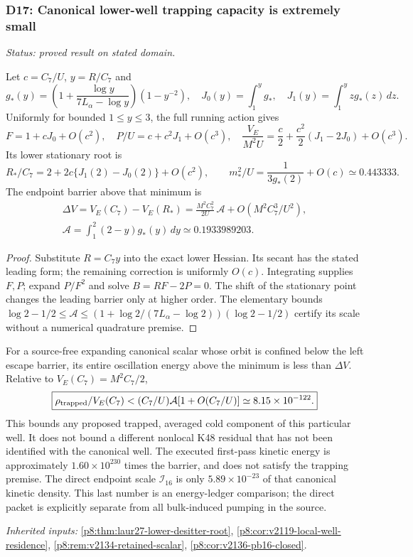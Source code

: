 \documentclass[12pt,a4paper]{article}
\begin{document}
\subsubsection{D17: Canonical lower-well trapping capacity is extremely small}
\label{p8:sec:v2201-derived-d17}
\noindent\textit{Status: proved result on stated domain.}

Let $c=C_7/U$, $y=R/C_7$ and
\[
 g_*(y)=\left(1+\frac{\log y}{7L_\alpha-\log y}\right)(1-y^{-2}),
 \quad J_0(y)=\int_1^y g_*,\quad J_1(y)=\int_1^y zg_*(z)\,dz.
\]
Uniformly for bounded $1\le y\le3$, the full running action gives
\[
 F=1+cJ_0+O(c^2),\quad P/U=c+c^2J_1+O(c^3),\quad
 \frac{V_E}{M^2U}=\frac c2+\frac{c^2}{2}(J_1-2J_0)+O(c^3).
\]
Its lower stationary root is
\[
 R_*/C_7=2+2c\{J_1(2)-J_0(2)\}+O(c^2),\qquad
 m_*^2/U=\frac1{3g_*(2)}+O(c)\simeq0.443333.
\]
The endpoint barrier above that minimum is
\begin{gather*}
 \boxed{\Delta V=V_E(C_7)-V_E(R_*)
 =\frac{M^2C_7^2}{2U}\,\mathcal A+O(M^2C_7^3/U^2),}\\
 \mathcal A=\int_1^2(2-y)g_*(y)\,dy\simeq0.1933989203.
\end{gather*}
\begin{proof}
Substitute $R=C_7y$ into the exact lower Hessian. Its secant
has the stated leading form; the remaining correction is uniformly $O(c)$.
Integrating supplies $F,P$; expand $P/F^2$ and solve $B=RF-2P=0$.
The shift of the stationary point changes the leading barrier only at
higher order. The elementary bounds
$\log2-1/2\le\mathcal A\le(1+\log2/(7L_\alpha-\log2))(\log2-1/2)$
certify its scale without a numerical quadrature premise.
\end{proof}

For a source-free expanding canonical scalar whose orbit is confined below
the left escape barrier, its entire oscillation energy above the minimum is
less than $\Delta V$. Relative to $V_E(C_7)=M^2C_7/2$,
\[
 \boxed{\rho_{\rm trapped}/V_E(C_7)<
 (C_7/U)\mathcal A[1+O(C_7/U)]\simeq8.15\times10^{-122}.}
\]
This bounds any proposed trapped, averaged cold component of this particular
well. It does not bound a different nonlocal K48 residual that has not been
identified with the canonical well. The executed first-pass kinetic energy
is approximately $1.60\times10^{230}$ times the barrier, and does not satisfy
the trapping premise. The direct endpoint scale $\mathcal I_{16}$ is only
$5.89\times10^{-23}$ of that canonical kinetic density. This last number is
an energy-ledger comparison; the direct packet is explicitly separate from
all bulk-induced pumping in the source.
\par\noindent\textit{Inherited inputs:} \ref{p8:thm:laur27-lower-desitter-root}, \ref{p8:cor:v2119-local-well-residence}, \ref{p8:rem:v2134-retained-scalar}, \ref{p8:cor:v2136-pb16-closed}.
\end{document}
